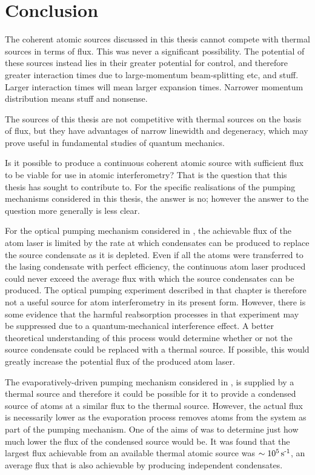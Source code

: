 \chapter{Conclusion}
\label{Conclusion}
\graphicspath{{Figures/Conclusion/}{Figures/Common/}}

The coherent atomic sources discussed in this thesis cannot compete with thermal sources in terms of flux.  This was never a significant possibility.  The potential of these sources instead lies in their greater potential for control, and therefore greater interaction times due to large-momentum beam-splitting etc, and stuff.  Larger interaction times will mean larger expansion times.  Narrower momentum distribution means stuff and nonsense.

The sources of this thesis are not competitive with thermal sources on the basis of flux, but they have advantages of narrow linewidth and degeneracy, which may prove useful in fundamental studies of quantum mechanics.



Is it possible to produce a continuous coherent atomic source with sufficient flux to be viable for use in atomic interferometry?  That is the question that this thesis has sought to contribute to.  For the specific realisations of the pumping mechanisms considered in this thesis, the answer is no; however the answer to the question more generally is less clear.  

For the optical pumping mechanism considered in , the achievable flux of the atom laser is limited by the rate at which condensates can be produced to replace the source condensate as it is depleted.  Even if all the atoms were transferred to the lasing condensate with perfect efficiency, the continuous atom laser produced could never exceed the average flux with which the source condensates can be produced.  The optical pumping experiment described in that chapter is therefore not a useful source for atom interferometry in its present form.  However, there is some evidence that the harmful reabsorption processes in that experiment may be suppressed due to a quantum-mechanical interference effect.  A better theoretical understanding of this process would determine whether or not the source condensate could be replaced with a thermal source.  If possible, this would greatly increase the potential flux of the produced atom laser.

The evaporatively-driven pumping mechanism considered in , is supplied by a thermal source and therefore it could be possible for it to provide a condensed source of atoms at a similar flux to the thermal source.  However, the actual flux is necessarily lower as the evaporation process removes atoms from the system as part of the pumping mechanism.  One of the aims of  was to determine just how much lower the flux of the condensed source would be.  It was found that the largest flux achievable from an available thermal atomic source was $\sim\unit[10^5]{s\textsuperscript{-1}}$, an average flux that is also achievable by producing independent condensates.

